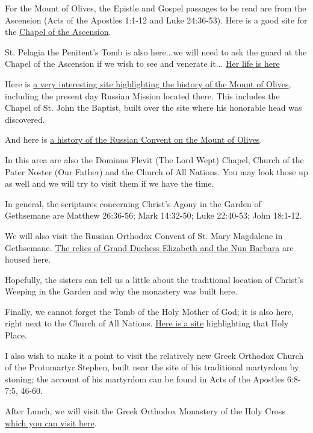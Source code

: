 \documentclass[letterpaper]{report}
\begin{document}
For the Mount of Olives, the Epistle and Gospel passages to be read are from
the Ascension (Acts of the Apostles 1:1-12 and Luke 24:36-53).
Here is a good site for the 
\href{http://www.sacred-destinations.com/israel/jerusalem-chapel-of-ascension}{
    Chapel of the Ascension}.

St. Pelagia the Penitent's Tomb is also here...we will need to ask the guard 
at the Chapel of the Ascension if we wish to see and venerate it...
\href{http://www.antiochian.org/node/16762}{
	Her life is here}

Here is 
\href{http://www.pravoslavie.ru/english/46854.htm}{
	a very interesting site highlighting the history of the Mount of Olives},
 including the present day Russian Mission located there.
 This includes the Chapel of St. John the Baptist,
 built over the site where his honorable head was discovered.

And here is \href{http://jerusalem-mission.org/convent_ascension.html}{
	a history of the Russian Convent on the Mount of Olives}.

In this area are also the Dominus Flevit (The Lord Wept) Chapel,
Church of the Pater Noster (Our Father) and the Church of All Nations.
You may look those up as well and we will try to visit them if we have the 
time.

In general, the scriptures concerning Christ's Agony in the Garden of 
Gethsemane are Matthew 26:36-56; Mark 14:32-50; Luke 22:40-53; John 18:1-12.

We will also visit the Russian Orthodox Convent of St. Mary Magdalene in
Gethsemane.
\href{http://www.pravoslavie.ru/english/63239.htm}{
The relics of Grand Duchess Elizabeth and the Nun Barbara} are housed here.

Hopefully, the sisters can tell us a little about the traditional location of 
Christ's Weeping in the Garden and why the monastery was built here.

Finally, we cannot forget the Tomb of the Holy Mother of God;
it is also here, right next to the Church of All Nations.
\href{https://orthodoxword.wordpress.com/2010/08/15/the-tomb-of-the-most-holy-virgin-jerusalem/}{
Here is a site} highlighting that Holy Place.

I also wish to make it a point to visit the relatively new Greek Orthodox
Church of the Protomartyr Stephen,
built near the site of his traditional martyrdom by stoning;
the account of his martyrdom can be found in
Acts of the Apostles 6:8-7:5, 46-60.

After Lunch,
we will visit the Greek Orthodox Monastery of the Holy Cross
\href{http://www.biblewalks.com/Sites/CrossMonastery.html}{
	which you can visit here}.
\end{document}
